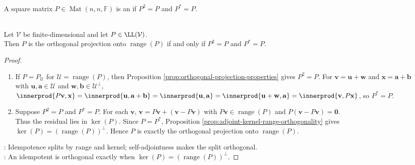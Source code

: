 \begin{definition} \label{def:orthogonal-projection-matrix} \\
A square matrix $P\in\operatorname{Mat}(n,n,\mathbb{F})$ is an  if $P^2=P$ and $P^*=P$.
\end{definition}

\begin{theorem} \label{thm:orthogonal-projection-self-adjoint-idempotent} \\
Let $\mathcal{V}$ be finite-dimensional and let $P\in\LL(\mathcal{V})$.\\
Then $P$ is the orthogonal projection onto $\operatorname{range}(P)$ if and only if $P^2=P$ and $P^*=P$.
\begin{proof}
\begin{enumerate}[label=\roman*.]
\setlength{\itemsep}{0pt}
\item[$(\Rightarrow)$] If $P=P_{\mathcal{U}}$ for $\mathcal{U}=\operatorname{range}(P)$, then Proposition \ref{prop:orthogonal-projection-properties} gives $P^2=P$. For $\mathbf{v}=\mathbf{u}+\mathbf{w}$ and $\mathbf{x}=\mathbf{a}+\mathbf{b}$ with $\mathbf{u},\mathbf{a}\in\mathcal{U}$ and $\mathbf{w},\mathbf{b}\in\mathcal{U}^{\perp}$, $\innerprod{P\mathbf{v},\mathbf{x}}=\innerprod{\mathbf{u},\mathbf{a}+\mathbf{b}}=\innerprod{\mathbf{u},\mathbf{a}} =\innerprod{\mathbf{u}+\mathbf{w},\mathbf{a}}=\innerprod{\mathbf{v},P\mathbf{x}}$, so $P^*=P$.
\item[$(\Leftarrow)$] Suppose $P^2=P$ and $P^*=P$. For each $\mathbf{v}$, $\mathbf{v}=P\mathbf{v}+(\mathbf{v}-P\mathbf{v})$ with $P\mathbf{v}\in\operatorname{range}(P)$ and $P(\mathbf{v}-P\mathbf{v})=\mathbf{0}$.\\
Thus the residual lies in $\ker(P)$. Since $P=P^*$, Proposition \ref{prop:adjoint-kernel-range-orthogonality} gives $\ker(P)=(\operatorname{range}(P))^{\perp}$. Hence $P$ is exactly the orthogonal projection onto $\operatorname{range}(P)$.
\end{enumerate}
: Idempotence splits by range and kernel; self-adjointness makes the split orthogonal.\\
: An idempotent is orthogonal exactly when $\ker(P)=(\operatorname{range}(P))^{\perp}$.
\end{proof}
\end{theorem}

